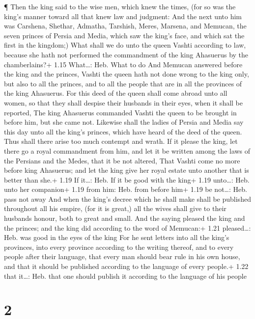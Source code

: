  ¶ Then the king said to the wise men, which knew the
times, (for so was the king's manner toward all that knew law and
judgment:  And the next unto him was Carshena, Shethar,
Admatha, Tarshish, Meres, Marsena, and Memucan, the seven princes of
Persia and Media, which saw the king's face, and which sat the first in
the kingdom;)  What shall we do unto the queen Vashti
according to law, because she hath not performed the commandment of the
king Ahasuerus by the chamberlains?+ 1.15 What\ldots: Heb. What to do
 And Memucan answered before the king and the princes,
Vashti the queen hath not done wrong to the king only, but also to all
the princes, and to all the people that are in all the provinces of the
king Ahasuerus.  For this deed of the queen shall come
abroad unto all women, so that they shall despise their husbands in
their eyes, when it shall be reported, The king Ahasuerus commanded
Vashti the queen to be brought in before him, but she came not.
 Likewise shall the ladies of Persia and Media say this day
unto all the king's princes, which have heard of the deed of the queen.
Thus shall there arise too much contempt and wrath.  If it
please the king, let there go a royal commandment from him, and let it
be written among the laws of the Persians and the Medes, that it be not
altered, That Vashti come no more before king Ahasuerus; and let the
king give her royal estate unto another that is better than she.+ 1.19
If it\ldots: Heb. If it be good with the king+ 1.19 unto\ldots: Heb.
unto her companion+ 1.19 from him: Heb. from before him+ 1.19 be
not\ldots: Heb. pass not away  And when the king's decree
which he shall make shall be published throughout all his empire, (for
it is great,) all the wives shall give to their husbands honour, both to
great and small.  And the saying pleased the king and the
princes; and the king did according to the word of Memucan:+ 1.21
pleased\ldots: Heb. was good in the eyes of the king  For
he sent letters into all the king's provinces, into every province
according to the writing thereof, and to every people after their
language, that every man should bear rule in his own house, and that it
should be published according to the language of every people.+ 1.22
that it\ldots: Heb. that one should publish it according to the language
of his people

\hypertarget{section-1}{%
\section{2}\label{section-1}}

